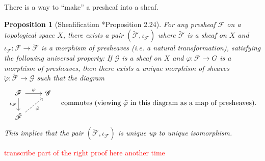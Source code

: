 \documentclass[11pt,leqno]{article}
\newcommand{\sai}[1]{\textcolor{red}{#1}}
\theoremstyle{plain}
\newtheorem{proposition}[lem]{Proposition}
\theoremstyle{definition}
\numberwithin{equation}{section}
\numberwithin{lem}{section}
\begin{document}
There is a way to ``make'' a presheaf into a sheaf.
\begin{proposition}[Sheafification \cite{gw}*{Proposition 2.24}]
  For any presheaf $\mathscr F$ on a topological space $X$, there exists a pair $(\tilde{\mathscr F}, \iota_{\mathscr F})$ where $\tilde{\mathscr F}$ is a sheaf on $X$ and $\iota_{\mathscr F}\colon \mathscr F\to\tilde{\mathscr F}$ is a morphism of presheaves (i.e. a natural transformation), satisfying the following universal property: If $\mathscr G$ is a sheaf on $X$ and $\varphi\colon\mathscr F\to G$ is a morphism of presheaves, then there exists a unique morphism of sheaves $\tilde{\varphi}\colon\tilde{\mathscr F}\to \mathscr G$ such that the diagram
  \begin{equation}
    \begin{tikzcd}[ampersand replacement=\&]
      {\mathscr F} \& {\mathscr G} \\
      {\tilde{\mathscr F}}
      \arrow["\varphi", from=1-1, to=1-2]
      \arrow["{\iota_{\mathscr F}}"', from=1-1, to=2-1]
      \arrow["{\tilde{\varphi}}"', dashed, from=2-1, to=1-2]
    \end{tikzcd}\quad\text{commutes \textup{(}viewing $\tilde{\varphi}$ in this diagram as a map of presheaves\textup{)}.}
  \end{equation}
  This implies that the pair $(\tilde{\mathscr F},\iota_{\mathscr F})$ is unique up to unique isomorphism.
\end{proposition}
\sai{transcribe part of the right proof here another time}
\end{document}
